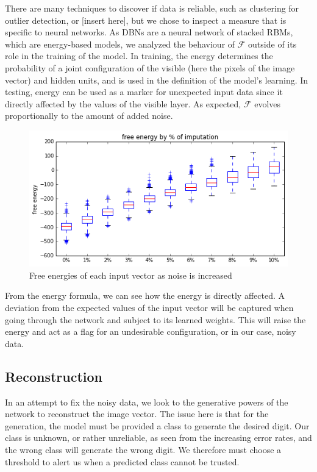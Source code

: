 \documentclass{report}
\begin{document}
There are many techniques to discover if data is reliable, such as clustering for outlier detection, or [insert here], but we chose to inspect a measure that is specific to neural networks. As DBNs are a neural network of stacked RBMs, which are energy-based models, we analyzed the behaviour of $\mathcal{F}$ outside of its role in the training of the model. In training, the energy determines the probability of a joint configuration of the visible (here the pixels of the image vector) and hidden units, and is used in the definition of the model's learning. In testing, energy can be used as a marker for unexpected input data since it directly affected by the values of the visible layer. As expected, $\mathcal{F}$ evolves proportionally to the amount of added noise. 

\begin{figure}
	\centering
		\includegraphics[width=\textwidth]{nrgs_bp}
	\caption{Free energies of each input vector as noise is increased}
\end{figure}


From the energy formula, we can see how the energy is directly affected. A deviation from the expected values of the input vector will be captured when going through the network and subject to its learned weights. This will raise the energy and act as a flag for an undesirable configuration, or in our case, noisy data.


\subsection{Reconstruction}
In an attempt to fix the noisy data, we look to the generative powers of the network to reconstruct the image vector. The issue here is that for the generation, the model must be provided a class to generate the desired digit. Our class is unknown, or rather unreliable, as seen from the increasing error rates, and the wrong class will generate the wrong digit. We therefore must choose a threshold to alert us when a predicted class cannot be trusted.
\end{document}
